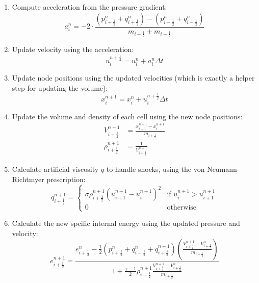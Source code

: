 \documentclass[11pt]{article}
\begin{document}
\begin{enumerate}
  
  \item Compute acceleration from the pressure gradient: 
  \begin{equation}
    a_i^{n} = -2 \cdot \frac{\left(p_{i+\frac{1}{2}}^n + q_{i+\frac{1}{2}}^n\right) - \left(p_{i-\frac{1}{2}}^n + q_{i-\frac{1}{2}}^n\right)}{m_{i+\frac{1}{2}} + m_{i-\frac{1}{2}}}
  \end{equation}
  \item Update velocity using the acceleration:
  \begin{equation}
    u_i^{n+\frac{1}{2}} = u_i^{n} + a_i^{n} \Delta t
  \end{equation}
  \item Update node positions using the updated velocities (which is exactly a helper step for updating the volume):
  \begin{equation}
    x_i^{n + 1} = x_i^{n} + u_i^{n+\frac{1}{2}} \Delta t
  \end{equation}
  \item Update the volume and density of each cell using the new node positions:
  \begin{align}
    V_{i+\frac{1}{2}}^{n+1} &= \frac{x_{i+1}^{n+1} - x_i^{n+1}}{m_{i+\frac{1}{2}}} \\
    \rho_{i+\frac{1}{2}}^{n+1} &= \frac{1}{V_{i+\frac{1}{2}}^{n+1}}
  \end{align}
  \item Calculate artificial viscosity $q$ to handle shocks, using the von Neumann-Richtmyer prescription:
  \begin{equation}
    q_{i+\frac{1}{2}}^{n+1} = \begin{cases}
      \sigma \rho_{i+\frac{1}{2}}^{n+1} \left(u_{i+1}^{n+1} - u_i^{n+1}\right)^2 & \text{if } u_i^{n+1} > u_{i+1}^{n+1} \\
      0 & \text{otherwise}
    \end{cases}
  \end{equation}
  \item Calculate the new spcific internal energy using the updated pressure and velocity:
  \begin{equation}
    e_{i+\frac{1}{2}}^{n+1} = \frac{e_{i+\frac{1}{2}}^{n} -\frac{1}{2} \left(p_{i+\frac{1}{2}}^{n} + q_{i+\frac{1}{2}}^{n} + q_{i+\frac{1}{2}}^{n+1}\right) \left(\frac{V_{i+\frac{1}{2}}^{n+1} - V_{i+\frac{1}{2}}^{n}}{m_{i+\frac{1}{2}}}\right)}{1 + \frac{\gamma - 1}{2} \rho_{i+\frac{1}{2}}^{n+1} \frac{V_{i+\frac{1}{2}}^{n+1} - V_{i+\frac{1}{2}}^{n}}{m_{i+\frac{1}{2}}}}

\end{equation}
\end{enumerate}
\end{document}
